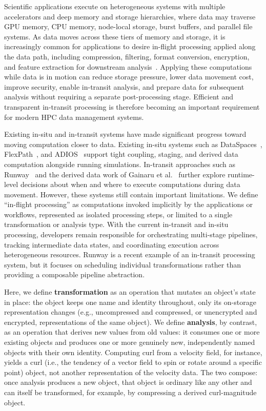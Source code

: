 Scientific applications execute on heterogeneous systems with multiple accelerators and deep memory and storage hierarchies, where data may traverse GPU memory, CPU memory, node-local storage, burst buffers, and parallel file systems. As data moves across these tiers of memory and storage, it is increasingly common for applications to desire in-flight processing applied along the data path, including compression, filtering, format conversion, encryption, and feature extraction for downstream analysis~\cite{ecp2019eqsim, mccallen2021eqsim, mccallen2024regional, patwary2015bdcats, tan2022analysis}. Applying these computations while data is in motion can reduce storage pressure, lower data movement cost, improve security, enable in-transit analysis, and prepare data for subsequent analysis without requiring a separate post-processing stage. Efficient and transparent in-transit processing is therefore becoming an important requirement for modern HPC data management systems.

Existing in-situ and in-transit systems have made significant progress toward moving computation closer to data. Existing in-situ systems such as DataSpaces~\cite{dataspaces}, FlexPath~\cite{flexpath}, and ADIOS~\cite{godoy2020adios2} support tight coupling, staging, and derived data computation alongside running simulations. In-transit approaches such as Runway~\cite{ravi2023runway} and the derived data work of Gainaru et al.~\cite{gainaru2024toderive} further explore runtime-level decisions about when and where to execute computations during data movement. 
However, these systems still contain important limitations. We define  ``in-flight processing'' as computations 
invoked implicitly 
by the applications or workflows, represented as isolated processing steps, or limited to a single transformation or analysis type. %
With the current in-transit and in-situ processing, developers remain responsible for orchestrating multi-stage pipelines, tracking intermediate data states, and coordinating execution across heterogeneous resources. Runway \cite{ravi2023runway} is a recent example of an in-transit processing system, but it focuses on scheduling individual transformations rather than providing a composable pipeline abstraction. 

{\color{red}Here, we define \textbf{transformation} as an operation that mutates an object's state in place: the object keeps one name and identity throughout, only its on-storage representation changes (e.g., uncompressed and compressed, or unencrypted and encrypted, representations of the same object). We define \textbf{analysis}, by contrast, as an operation that derives new values from old values: it consumes one or more existing objects and produces one or more genuinely new, independently named objects with their own identity. Computing curl from a velocity field, for instance, yields a curl (i.e., the tendency of a vector field to spin or rotate around a specific point) object, not another representation of the velocity data. The two compose: once analysis produces a new object, that object is ordinary like any other and can itself be transformed, for example, by compressing a derived curl-magnitude object.}

